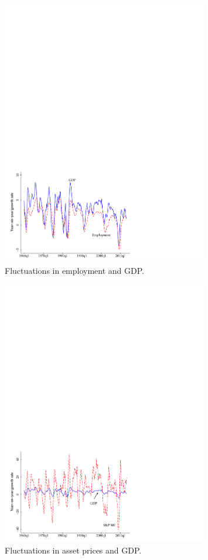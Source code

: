 \begin{figure}[h!]
\caption{Fluctuations in employment and GDP.}
    \label{fig:labor}%
    \centering
    \includegraphics[width=0.8\textwidth]{Figures/us_emp_gdp.pdf}
\end{figure}

\begin{figure}[h!]
    \caption{Fluctuations in asset prices and GDP.}
    \label{fig:stock}%
    \centering
    \includegraphics[width=0.8\textwidth]{Figures/us_gdp_sp500.pdf}
\end{figure}

